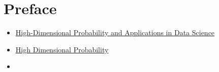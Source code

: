 \chapter{Preface}

\begin{itemize}
    \item \href{https://www.math.uci.edu/~rvershyn/teaching/hdp/hdp.html}{High-Dimensional Probability and Applications in Data Science}
    \item \href{https://www.tengjiaye.com/HDP.html}{High Dimensional Probability}
    \item \href{https://www.cs.cmu.edu/~venkatg/teaching/CStheory-infoage/}{}
\end{itemize}